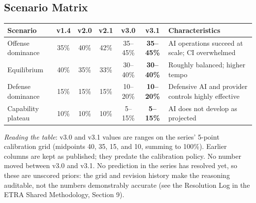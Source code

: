 \documentclass[11pt,letterpaper]{article}
\newcommand{\etraneed}[1]{\par\ifdim\pagegoal<\maxdimen\ifdim\pagetotal<\pagegoal\ifdim\dimexpr\pagegoal-\pagetotal\relax<\dimexpr#1\relax\newpage\fi\fi\fi}
\begin{document}
\etraneed{16\baselineskip}
\subsection{Scenario Matrix}

\begin{center}
\small
\begin{tabular}{L{2.8cm}cccccL{4.2cm}}
\toprule
\textbf{Scenario} & \textbf{v1.4} & \textbf{v2.0} & \textbf{v2.1} & \textbf{v3.0} & \textbf{v3.1} & \textbf{Characteristics} \\
\midrule
Offense dominance & 35\% & 40\% & 42\% & 35--45\% & \textbf{35--45\%} & AI operations succeed at scale; CI overwhelmed \\
Equilibrium & 40\% & 35\% & 33\% & 30--40\% & \textbf{30--40\%} & Roughly balanced; higher tempo \\
Defense dominance & 15\% & 15\% & 15\% & 10--20\% & \textbf{10--20\%} & Defensive AI and provider controls highly effective \\
Capability plateau & 10\% & 10\% & 10\% & 5--15\% & \textbf{5--15\%} & AI does not develop as projected \\
\bottomrule
\end{tabular}
\end{center}

\textit{Reading the table}: v3.0 and v3.1 values are ranges on the series' 5-point calibration grid (midpoints 40, 35, 15, and 10, summing to 100\%). Earlier columns are kept as published; they predate the calibration policy. No number moved between v3.0 and v3.1. No prediction in the series has resolved yet, so these are unscored priors: the grid and revision history make the reasoning auditable, not the numbers demonstrably accurate (see the Resolution Log in the ETRA Shared Methodology, Section 9).
\end{document}
